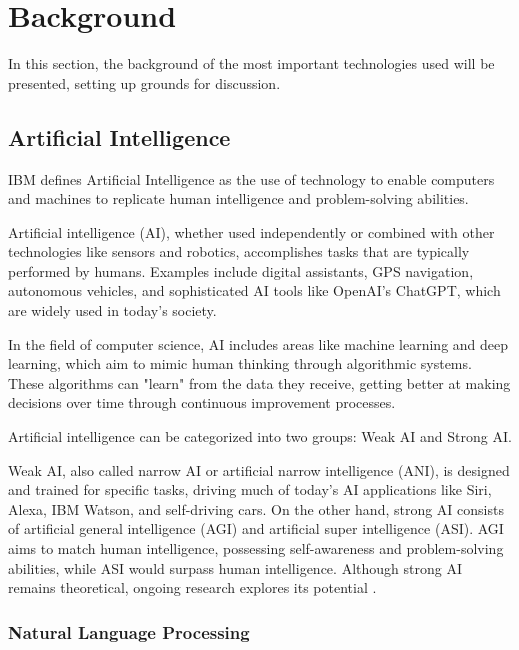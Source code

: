 \chapter{Background}
In this section, the background of the most important technologies used will be presented, setting up grounds for discussion.

\section{Artificial Intelligence}

IBM defines Artificial Intelligence as the use of technology to enable computers and machines to replicate human intelligence and problem-solving abilities.

Artificial intelligence (AI), whether used independently or combined with other technologies like sensors and robotics, accomplishes tasks that are typically performed by humans. Examples include digital assistants, GPS navigation, autonomous vehicles, and sophisticated AI tools like OpenAI's ChatGPT, which are widely used in today's society.

In the field of computer science, AI includes areas like machine learning and deep learning, which aim to mimic human thinking through algorithmic systems. These algorithms can "learn" from the data they receive, getting better at making decisions over time through continuous improvement processes.


Artificial intelligence can be categorized into two groups: Weak AI and Strong AI.

Weak AI, also called narrow AI or artificial narrow intelligence (ANI), is designed and trained for specific tasks, driving much of today's AI applications like Siri, Alexa, IBM Watson, and self-driving cars. On the other hand, strong AI consists of artificial general intelligence (AGI) and artificial super intelligence (ASI). AGI aims to match human intelligence, possessing self-awareness and problem-solving abilities, while ASI would surpass human intelligence. Although strong AI remains theoretical, ongoing research explores its potential \cite{IBM}. 

\subsection{Natural Language Processing}

